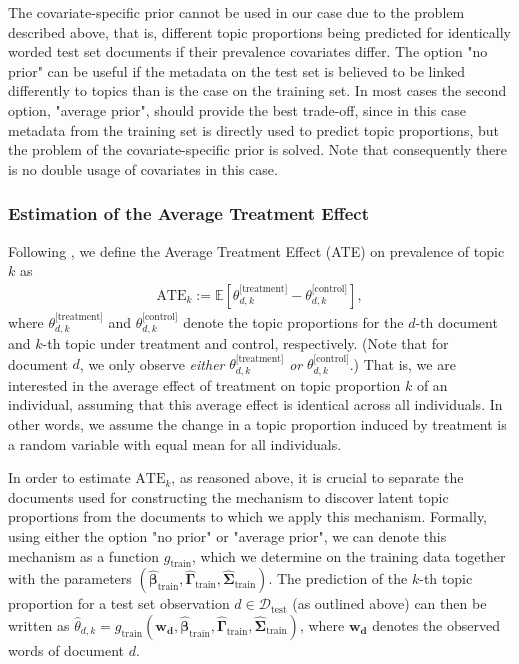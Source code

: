 The covariate-specific prior cannot be used in our case due to the problem described above, that is, different topic proportions being predicted for identically worded test set documents if their prevalence covariates differ. The option "no prior" can be useful if the metadata on the test set is believed to be linked differently to topics than is the case on the training set. In most cases the second option, "average prior", should provide the best trade-off, since in this case metadata from the training set is directly used to predict topic proportions, but the problem of the covariate-specific prior is solved. Note that consequently there is no double usage of covariates in this case.

\subsubsection{Estimation of the Average Treatment Effect}
\label{Estimation of the Average Treatment Effect}

Following \cite{egami2018make}, we define the Average Treatment Effect (ATE) on prevalence of topic $k$ as
\begin{align}
\text{ATE}_k := \mathbb{E}[\theta^{\text{[treatment]}}_{d,k} - \theta^{\text{[control]}}_{d,k}],
\end{align}
where $\theta^{\text{[treatment]}}_{d,k}$ and $\theta^{\text{[control]}}_{d,k}$ denote the topic proportions for the $d$-th document and $k$-th topic under treatment and control, respectively. (Note that for document $d$, we only observe \textit{either} $\theta^{\text{[treatment]}}_{d,k}$ \textit{or} $\theta^{\text{[control]}}_{d,k}$.) That is, we are interested in the average effect of treatment on topic proportion $k$ of an individual, assuming that this average effect is identical across all individuals. In other words, we assume the change in a topic proportion induced by treatment is a random variable with equal mean for all individuals. 

In order to estimate $\text{ATE}_k$, as reasoned above, it is crucial to separate the documents used for constructing the mechanism to discover latent topic proportions from the documents to which we apply this mechanism. Formally, using either the option "no prior" or "average prior", we can denote this mechanism as a function $g_{\text{train}}$, which we determine on the training data together with the parameters $(\hat{\boldsymbol{\beta}}_{\text{train}}, \hat{\boldsymbol{\Gamma}}_{\text{train}}, \hat{\boldsymbol{\Sigma}}_{\text{train}})$. The prediction of the $k$-th topic proportion for a test set observation $d \in \mathcal{D}_{\text{test}}$ (as outlined above) can then be written as $\hat{\theta}_{d,k} = g_{\text{train}}(\boldsymbol{w_d}, \hat{\boldsymbol{\beta}}_{\text{train}}, \hat{\boldsymbol{\Gamma}}_{\text{train}}, \hat{\boldsymbol{\Sigma}}_{\text{train}})$, where $\boldsymbol{w_d}$ denotes the observed words of document $d$. 

